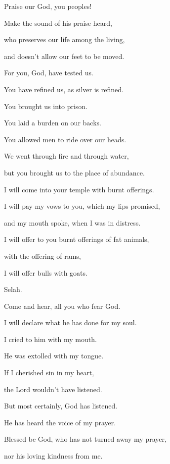 {\Q {}Praise our God, you peoples!
\par }{\QB Make the sound of his praise heard,
\par }{\Q {}who preserves our life among the living,
\par }{\QB and doesn’t allow our feet to be moved.
\par }{\Q {}For you, God, have tested us.
\par }{\QB You have refined us, as silver is refined.
\par }{\Q {}You brought us into prison.
\par }{\QB You laid a burden on our backs.
\par }{\Q {}You allowed men to ride over our heads.
\par }{\QB We went through fire and through water,
\par }{\QB but you brought us to the place of abundance.
\par }{\Q {}I will come into your temple with burnt offerings.
\par }{\QB I will pay my vows to you,
which my lips promised,
\par }{\QB and my mouth spoke, when I was in distress.
\par }{\Q {}I will offer to you burnt offerings of fat animals,
\par }{\QB with the offering of rams,
\par }{\QB I will offer bulls with goats.
\par }{\QS Selah.\par }
{\Q {}Come and hear, all you who fear God.
\par }{\QB I will declare what he has done for my soul.
\par }{\Q {}I cried to him with my mouth.
\par }{\QB He was extolled with my tongue.
\par }{\Q {}If I cherished sin in my heart,
\par }{\QB the Lord wouldn’t have listened.
\par }{\Q {}But most certainly, God has listened.
\par }{\QB He has heard the voice of my prayer.
\par }{\Q {}Blessed be God, who has not turned away my prayer,
\par }{\QB nor his loving kindness from me.

\par }
